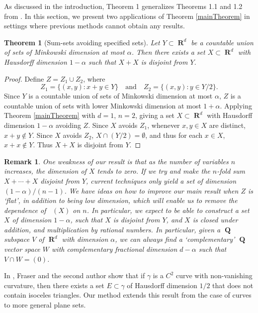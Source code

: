 \documentclass[dvipsnames,letterpaper,12pt]{article}
\numberwithin{equation}{section}
\theoremstyle{plain}
\newtheorem{theorem}{Theorem}
\newtheorem*{remark}{Remark}
\DeclareMathOperator{\hausdim}{\dim_{\mathbf{H}}}
\DeclareMathOperator{\RR}{\mathbf{R}}
\DeclareMathOperator{\QQ}{\mathbf{Q}}
\begin{document}
As discussed in the introduction, Theorem 1 generalizes Theorems 1.1 and 1.2 from \cite{MalabikaRob}. In this section, we present two applications of Theorem \ref{mainTheorem} in settings where previous methods cannot obtain any results.

\begin{theorem}[Sum-sets avoiding specified sets]
	Let $Y \subset \RR^d$ be a countable union of sets of Minkowski dimension at most $\alpha$. Then there exists a set $X \subset \RR^d$ with Hausdorff dimension $1 - \alpha$ such that $X + X$ is disjoint from $Y$.
\end{theorem}
\begin{proof}
	Define $Z = Z_1 \cup Z_2$, where
	\[ Z_1 = \{ (x,y) : x + y \in Y \} \quad \text{and} \quad Z_2 = \{ (x,y): y \in Y/2 \}. \]
	Since $Y$ is a countable union of sets of Minkowski dimension at most $\alpha$, $Z$ is a countable union of sets with lower Minkowski dimension at most $1 + \alpha$. Applying Theorem \ref{mainTheorem} with $d = 1$, $n = 2$, giving a set $X \subset \RR^d$ with Hausdorff dimension $1 - \alpha$ avoiding $Z$. Since $X$ avoids $Z_1$, whenever $x,y \in X$ are distinct, $x + y \not \in Y$. Since $X$ avoids $Z_2$, $X \cap (Y/2) = \emptyset$, and thus for each $x \in X$, $x + x \not \in Y$. Thus $X + X$ is disjoint from $Y$.
\end{proof}

\begin{remark}
	One weakness of our result is that as the number of variables $n$ increases, the dimension of $X$ tends to zero. If we try and make the $n$-fold sum $X + \cdots + X$ disjoint from $Y$, current techniques only yield a set of dimension $(1 - \alpha)/(n-1)$. We have ideas on how to improve our main result when $Z$ is `flat', in addition to being low dimension, which will enable us to remove the dependence of $\hausdim(X)$ on $n$. In particular, we expect to be able to construct a set $X$ of dimension $1 - \alpha$, such that $X$ is disjoint from $Y$, and $X$ is closed under addition, and multiplication by rational numbers. In particular, given a $\QQ$ subspace $V$ of $\RR^d$ with dimension $\alpha$, we can always find a `complementary' $\QQ$ vector space $W$ with complementary fractional dimension $d - \alpha$ such that $V \cap W = (0)$.
\end{remark}

In \cite{MalabikaRob}, Fraser and the second author show that if $\gamma$ is a $C^2$ curve with non-vanishing curvature, then there exists a set $E \subset \gamma$ of Hausdorff dimension $1/2$ that does not contain isoceles triangles. Our method extends this result from the case of curves to more general plane sets.
\end{document}
